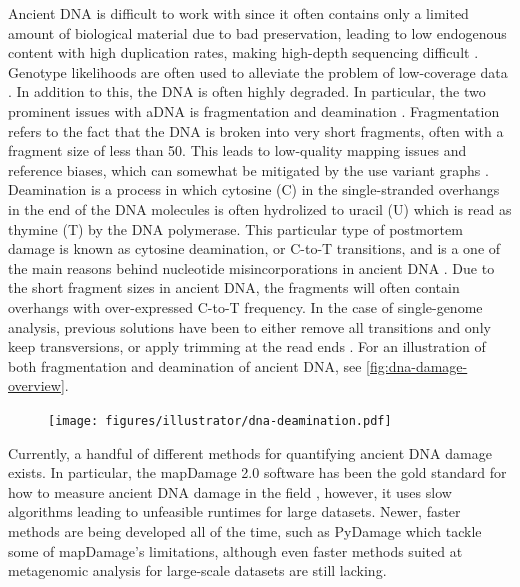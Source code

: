 Ancient DNA is difficult to work with since it often contains only a limited amount of biological material due to bad preservation, leading to low endogenous content with high duplication rates, making high-depth sequencing difficult \autocite{renaudAuthenticationAssessmentContamination2019}. Genotype likelihoods are often used to alleviate the problem of low-coverage data \autocite{nielsenGenotypeSNPCalling2011}.
In addition to this, the DNA is often highly degraded. In particular, the two prominent issues with aDNA is fragmentation and deamination \autocite{dabneyAncientDNADamage2013,peyregnePresentDayDNAContamination2020,}. Fragmentation refers to the fact that the DNA is broken into very short fragments, often with a fragment size of less than \SI{50}{\basepairs}. This leads to low-quality mapping issues and reference biases, which can somewhat be mitigated by the use variant graphs \autocite{martinianoRemovingReferenceBias2020}.
Deamination is a process in which cytosine (C) in the single-stranded overhangs in the end of the DNA molecules is often hydrolized to uracil (U) which is read as thymine (T) by the DNA polymerase. This particular type of postmortem damage is known as cytosine deamination, or C-to-T transitions, and is a one of the main reasons behind nucleotide misincorporations in ancient DNA \autocite{briggsPatternsDamageGenomic2007}. Due to the short fragment sizes in ancient DNA, the fragments will often contain overhangs with over-expressed C-to-T frequency. In the case of single-genome analysis, previous solutions have been to either remove all transitions and only keep transversions, or apply trimming at the read ends \autocite{schubertImprovingAncientDNA2012}.
For an illustration of both fragmentation and deamination of ancient DNA, see  \autoref{fig:dna-damage-overview}.

\begin{figure}[htbp]
    \centering
    \texttt{[image: figures/illustrator/dna-deamination.pdf]}
\end{figure}

Currently, a handful of different methods for quantifying ancient DNA damage exists. In particular, the mapDamage 2.0 software has been the gold standard for how to measure ancient DNA damage in the field \autocite{jonssonMapDamage2FastApproximate2013}, however, it uses slow algorithms leading to unfeasible runtimes for large datasets. Newer, faster methods are being developed all of the time, such as PyDamage \autocite{borryPyDamageAutomatedAncient2021} which tackle some of mapDamage's limitations, although even faster methods suited at metagenomic analysis for large-scale datasets are still lacking.

